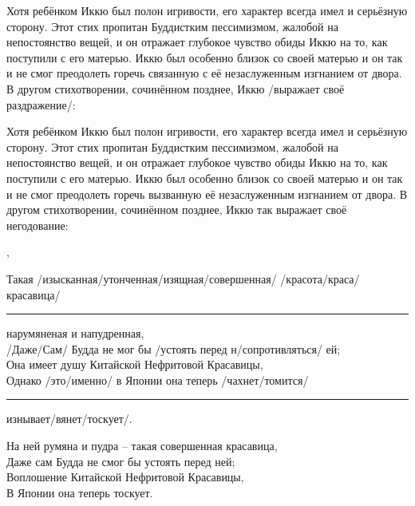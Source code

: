 \begin{ver}
Хотя ребёнком Иккю был полон игривости, его характер всегда имел и
серьёзную сторону. Этот стих пропитан Буддистким пессимизмом, жалобой
на непостоянство вещей, и он отражает глубокое чувство обиды Иккю на
то, как поступили с его матерью.  Иккю был особенно близок со своей
матерью и он так и не смог преодолеть горечь связанную с её
незаслуженным изгнанием от двора.
В другом стихотворении, сочинённом
позднее, Иккю /выражает своё раздражение/:
\end{ver}
\begin{ver}[1]
Хотя ребёнком Иккю был полон игривости, его характер всегда имел и
серьёзную сторону. Этот стих пропитан Буддистким пессимизмом, жалобой
на непостоянство вещей, и он отражает глубокое чувство обиды Иккю на
то, как поступили с его матерью.  Иккю был особенно близок со своей
матерью и он так и не смог преодолеть горечь вызванную  её
незаслуженным изгнанием от двора.
В другом стихотворении, сочинённом
позднее, Иккю так выражает своё негодование:
\end{ver}
\sep

\begin{ver}
  \begin{verses}
    Такая /изысканная/утонченная/изящная/совершенная/
    /красота/краса/красавица/\\
    \rule{7mm}{0mm}нарумяненая и напудренная,\\
    /Даже/Сам/ Будда не мог бы /устоять перед н/сопротивляться/ ей;\\
    Она имеет душу Китайской Нефритовой Красавицы,\\
    Однако /это/именно/ в Японии она теперь
    /чахнет/томится/\\
    \rule{7mm}{0mm}изнывает/вянет/тоскует/. 
  \end{verses}
\end{ver}

\begin{ver}[1]
  \begin{verses}
    На ней румяна и пудра -- такая совершенная красавица,\\
    Даже сам Будда не смог бы устоять перед ней;\\
    Воплошение Китайской Нефритовой Красавицы,\\
    В Японии она теперь тоскует. 
  \end{verses}
\end{ver}

